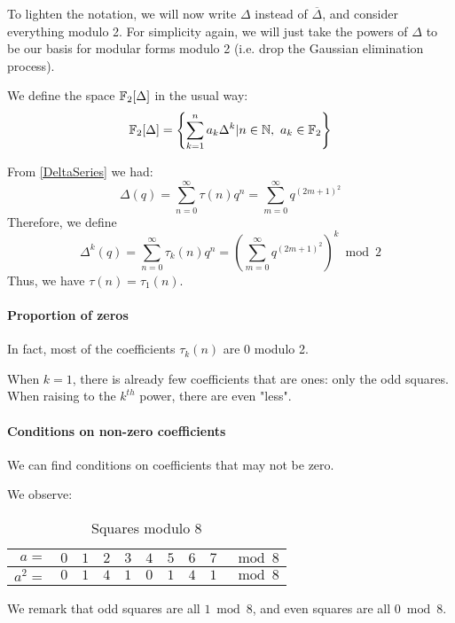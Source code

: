 To lighten the notation, we will now write $\Delta$ instead of $\overline{\Delta}$, and consider everything modulo 2.
For simplicity again, we will just take the powers of $\Delta$ to be our basis for modular forms modulo 2 (i.e. drop the Gaussian elimination process).

We define the space $\mathbb{F}_2[\Delta]$ in the usual way:
$$
\mathbb{F}_2[\Delta] = \left\lbrace \sum_{k=1}^{n}a_k \Delta^k | n \in \mathbb{N}, \  a_k \in \mathbb{F}_2 \right\rbrace
$$


From \ref{DeltaSeries} we had:
$$
\Delta(q) 
= \sum_{n=0}^{\infty} \tau(n)q^n
= \sum_{m=0}^{\infty} q^{(2m+1)^2}
$$
Therefore, we define 
$$
\Delta^{k}(q) 
= \sum_{n=0}^{\infty} \tau_k(n)q^n
= \left( \sum_{m=0}^{\infty} q^{(2m+1)^2} \right)^k \bmod 2
$$
Thus, we have $\tau(n)=\tau_1(n)$.

\paragraph{Proportion of zeros}
In fact, most of the coefficients $\tau_k(n)$ are $0$ modulo 2.

When $k=1$, there is already few coefficients that are ones: only the odd squares.
When raising to the $k^{th}$ power, there are even "less".

\paragraph{Conditions on non-zero coefficients}
We can find conditions on coefficients that may not be zero.

We observe:
\begin{table}[!ht]

	\begin{center}
		\begin{tabular}{|r||c|c|c|c|c|c|c|c||l|}
			\hline
			$a=$ & $0$ & $1$ & $2$ & $3$ & $4$ & $5$ & $6$ & $7$ & $\bmod 8$ \\
			\hline
			$a^2=$ & \color{BrickRed} $0$ & \color{ForestGreen} $1$ & \color{BrickRed} $4$ & \color{ForestGreen} $1$ & \color{BrickRed} $0$ & \color{ForestGreen} $1$ & \color{BrickRed} $4$ & \color{ForestGreen} $1$ & $\bmod 8$ \\
			\hline

		\end{tabular}
	\end{center}
	\caption{Squares modulo $8$}
	\label{table:SquaresMod8}
\end{table}
We remark that odd squares are all $1 \bmod 8$, and even squares are all $0 \bmod 8$.

